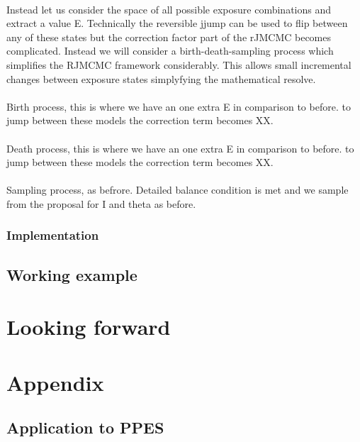 \documentclass{article}
\begin{document}
\paragraph{}Instead let us consider the space of all possible exposure combinations and extract a value E. Technically the reversible jjump can be used to flip between any of these states but the correction factor part of the rJMCMC becomes complicated. Instead we will consider a birth-death-sampling process which simplifies the RJMCMC framework considerably. This allows small incremental changes between exposure states simplyfying the mathematical resolve. 

\paragraph{}Birth process, this is where we have an one extra E in comparison to before. to jump between these models the correction term becomes XX. 

\paragraph{}Death process, this is where we have an one extra E in comparison to before. to jump between these models the correction term becomes XX. 

\paragraph{}Sampling process, as befrore. Detailed balance condition is met and we sample from the proposal for I and theta as before. 



\subsubsection{Implementation}


\subsection{Working example}


\section{Looking forward}

\section{Appendix}
\subsection{Application to PPES}
\end{document}
